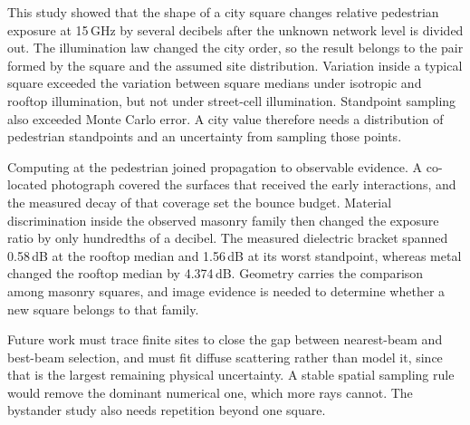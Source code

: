 \documentclass[journal]{IEEEtran}
\begin{document}
This study showed that the shape of a city square changes relative pedestrian
exposure at 15\,GHz by several decibels after the unknown network level is
divided out. The illumination law changed the city order, so the result belongs
to the pair formed by the square and the assumed site distribution. Variation
inside a typical square exceeded the variation between square medians under
isotropic and rooftop illumination, but not under street-cell illumination.
Standpoint sampling also exceeded Monte Carlo error. A city value therefore
needs a distribution of pedestrian standpoints and an uncertainty from sampling
those points.

Computing at the pedestrian joined propagation to observable evidence. A
co-located photograph covered the surfaces that received the early interactions,
and the measured decay of that coverage set the bounce budget. Material
discrimination inside the observed masonry family then changed the exposure
ratio by only hundredths of a decibel. The measured dielectric bracket spanned
0.58\,dB at the rooftop median and 1.56\,dB at its worst standpoint, whereas
metal changed the rooftop median by 4.374\,dB. Geometry
carries the comparison among masonry squares, and image evidence is needed to
determine whether a new square belongs to that family.

Future work must trace finite sites to close the gap between nearest-beam and
best-beam selection, and must fit diffuse scattering rather than model it, since
that is the largest remaining physical uncertainty. A stable spatial sampling
rule would remove the dominant numerical one, which more rays cannot. The
bystander study also needs repetition beyond one square.
\end{document}

